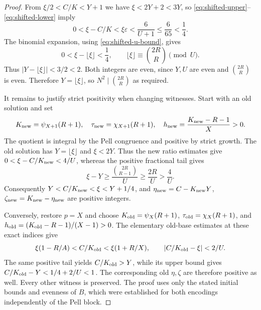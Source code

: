\begin{proof}
From $\xi/2<C/K<Y+1$ we have $\xi<2Y+2<3Y$, so
\eqref{eq:shifted-upper}--\eqref{eq:shifted-lower} imply
\[
 0<\xi-C/K<\xi\varepsilon
 <\frac6{U+1}\le\frac6{65}<\frac14.
\]
The binomial expansion, using \eqref{eq:shifted-u-bound}, gives
\[
 0<\xi-\lfloor\xi\rfloor<\frac14,
 \qquad \lfloor\xi\rfloor\equiv\binom{2R}{R}\pmod U.
\]
Thus $|Y-\lfloor\xi\rfloor|<3/2<2$. Both integers are even, since
$Y,U$ are even and $\binom{2R}{R}$ is even. Therefore
$Y=\lfloor\xi\rfloor$, so $N^2\mid\binom{2R}{R}$ as required.

It remains to justify strict positivity when changing witnesses.
Start with an old solution and set
\[
 K_{\rm new}=\psi_{X+1}(R+1),\quad
 \tau_{\rm new}=\chi_{X+1}(R+1),\quad
 h_{\rm new}=\frac{K_{\rm new}-R-1}{X}>0.
\]
The quotient is integral by the Pell congruence and positive by strict
growth. The old solution has $Y=\lfloor\xi\rfloor$ and $\xi<2Y$.
Thus the new ratio estimates give
$0<\xi-C/K_{\rm new}<4/U$, whereas the positive fractional tail gives
\[
 \xi-Y\ge\frac{\binom{2R}{R-1}}U\ge\frac{2R}U>\frac4U.
\]
Consequently $Y<C/K_{\rm new}<\xi<Y+1/4$, and
$\eta_{\rm new}=C-K_{\rm new}Y$,
$\zeta_{\rm new}=K_{\rm new}-\eta_{\rm new}$ are positive integers.

Conversely, restore $p=X$ and choose
$K_{\rm old}=\psi_X(R+1)$, $\tau_{\rm old}=\chi_X(R+1)$, and
$h_{\rm old}=(K_{\rm old}-R-1)/(X-1)>0$. The elementary old-base
estimates at these exact indices give
\[
 \xi(1-R/A)<C/K_{\rm old}<\xi(1+R/X),
 \qquad |C/K_{\rm old}-\xi|<2/U.
\]
The same positive tail yields $C/K_{\rm old}>Y$, while its upper
bound gives $C/K_{\rm old}-Y<1/4+2/U<1$. The corresponding old
$\eta,\zeta$ are therefore positive as well. Every other witness is
preserved. The proof uses only the stated initial bounds and evenness
of $B$, which were established for both encodings independently of
the Pell block.
\end{proof}

